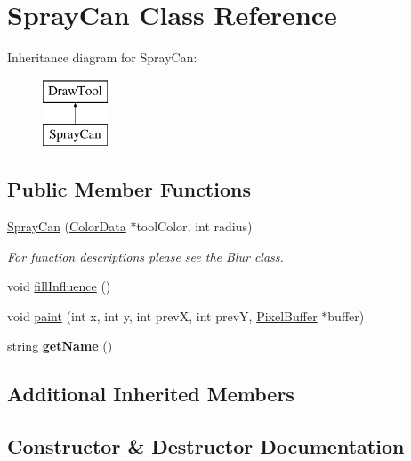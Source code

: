 \hypertarget{classSprayCan}{}\section{Spray\+Can Class Reference}
\label{classSprayCan}
Inheritance diagram for Spray\+Can\+:\begin{figure}[H]
\begin{center}
\leavevmode
\includegraphics[height=2.000000cm]{classSprayCan}
\end{center}
\end{figure}
\subsection*{Public Member Functions}
\begin{DoxyCompactItemize}
\item 
\hyperlink{classSprayCan_a5491c5e7346fb7126b45405664b22f5d}{Spray\+Can} (\hyperlink{classColorData}{Color\+Data} $\ast$tool\+Color, int radius)
\begin{DoxyCompactList}\small\item\em For function descriptions please see the \hyperlink{classBlur}{Blur} class. \end{DoxyCompactList}\item 
void \hyperlink{classSprayCan_a86321320d34fdc49c754ce6d1ff324fd}{fill\+Influence} ()
\item 
void \hyperlink{classSprayCan_ade6115cd8e7f277c74b0c6ade3547e2c}{paint} (int x, int y, int prevX, int prevY, \hyperlink{classPixelBuffer}{Pixel\+Buffer} $\ast$buffer)
\item 
string {\bfseries get\+Name} ()\hypertarget{classSprayCan_a6be9bc1725f16fdb0e6f3610fe60e22c}{}\label{classSprayCan_a6be9bc1725f16fdb0e6f3610fe60e22c}

\end{DoxyCompactItemize}
\subsection*{Additional Inherited Members}


\subsection{Constructor \& Destructor Documentation}
